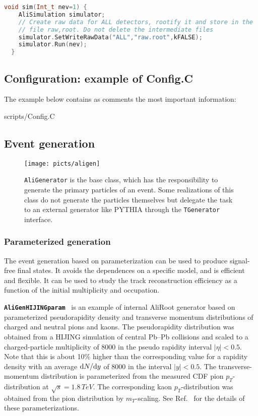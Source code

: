 \documentclass[12pt,a4paper,twoside]{article}
\newcommand{\class}[1]{\texttt{\textbf{#1}}\xspace}
\begin{document}
\begin{lstlisting}[language=C++]
  void sim(Int_t nev=1) {
    AliSimulation simulator;
    // Create raw data for ALL detectors, rootify it and store in the
    // file raw,root. Do not delete the intermediate files
    simulator.SetWriteRawData("ALL","raw.root",kFALSE);
    simulator.Run(nev);
  }
\end{lstlisting}


\subsection{Configuration: example of Config.C}

The example below contains as comments the most important information:

 {scripts/Config.C}


\subsection{Event generation}
\label{MC:Generators}
\begin{figure}[ht]
  \centering
  \texttt{[image: picts/aligen]}
  \caption{\texttt{AliGenerator} is the base class, which has the
    responsibility to generate the primary particles of an event. Some
    realizations of this class do not generate the particles themselves
    but delegate the task to an external generator like PYTHIA through the
    \texttt{TGenerator} interface.  }
  \label{MC:aligen}
\end{figure}

\subsubsection{Parameterized generation}

The event generation based on parameterization can be used to produce
signal-free final states. It avoids the dependences on a
specific model, and is efficient and flexible. It can be used to
study the track reconstruction efficiency
as a function of the initial multiplicity and occupation. 

\class{AliGenHIJINGparam}~\cite{MC:HIJINGparam} is an example of internal
AliRoot generator based on parameterized
pseudorapidity density and transverse momentum distributions of
charged and neutral pions and kaons. The pseudorapidity
distribution was obtained from a HIJING simulation of central
Pb--Pb collisions and scaled to a charged-particle multiplicity of
8000 in the pseudo rapidity interval $|\eta | < 0.5$. Note that
this is about 10\% higher than the corresponding value for a
rapidity density with an average ${\rm d}N/{\rm d}y$ of 8000 in
the interval $|y | < 0.5$.
The transverse-momentum distribution is parameterized from the
measured CDF pion $p_T$-distribution at $\sqrt{s} = 1.8 \, TeV$.
The corresponding kaon $p_T$-distribution was obtained from the
pion distribution by $m_T$-scaling. See Ref.~\cite{MC:HIJINGparam}
for the details of these parameterizations.
\end{document}
